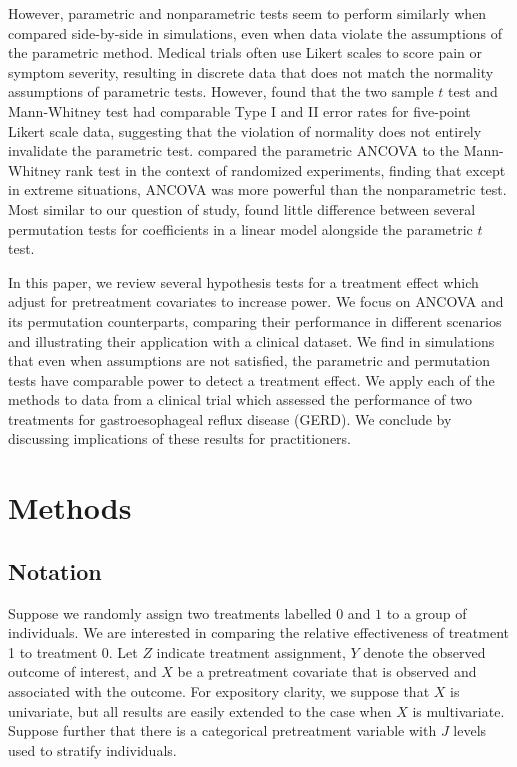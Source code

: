 \documentclass[12pt]{article}
\begin{document}
However, parametric and nonparametric tests seem to perform similarly when compared side-by-side in simulations, even when data violate the assumptions of the parametric method.
Medical trials often use Likert scales to score pain or symptom severity, resulting in discrete data that does not match the normality assumptions of parametric tests.
However, \cite{winter_five-point_2010} found that the two sample $t$ test and Mann-Whitney test had comparable Type I and II error rates for five-point Likert scale data, suggesting that the violation of normality does not entirely invalidate the parametric test.
\cite{vickers_parametric_2005} compared the parametric ANCOVA to the Mann-Whitney rank test in the context of randomized experiments, finding that except in extreme situations, ANCOVA was more powerful than the nonparametric test.
Most similar to our question of study, \cite{anderson_empirical_1999} found little difference between several permutation tests for coefficients in a linear model alongside the parametric $t$ test.

In this paper, we review several hypothesis tests for a treatment effect which adjust for pretreatment covariates to increase power.  
We focus on ANCOVA and its permutation counterparts, comparing their performance in different scenarios and illustrating their application with a clinical dataset.
We find in simulations that even when assumptions are not satisfied, the parametric and permutation tests have comparable power to detect a treatment effect.
We apply each of the methods to data from a clinical trial which assessed the performance of two treatments for gastroesophageal reflux disease (GERD).
We conclude by discussing implications of these results for practitioners.

\section{Methods}

\subsection{Notation}
Suppose we randomly assign two treatments labelled $0$ and $1$ to a group of individuals.
We are interested in comparing the relative effectiveness of treatment 1 to treatment 0.
Let $Z$ indicate treatment assignment,
$Y$ denote the observed outcome of interest,
and $X$ be a pretreatment covariate that is observed and associated with the outcome.
For expository clarity, we suppose that $X$ is univariate, but all results are easily extended to the case when $X$ is multivariate.
Suppose further that there is a categorical pretreatment variable with $J$ levels used to stratify individuals. 
\end{document}
